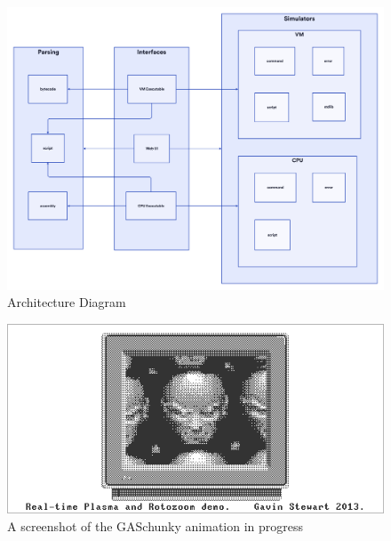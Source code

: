 \begin{center}
  \begin{figure}[h]
    \includegraphics[width=14cm]{fig/architecture.png}
    \caption{Architecture Diagram}%
    \label{fig:arch}
  \end{figure}
\end{center}

\begin{center}
  \begin{figure}[h]
    \includegraphics[width=14cm]{fig/gaschunky.png}
    \caption{A screenshot of the GASchunky animation in progress}%
    \label{fig:gaschunky-screenshot}
  \end{figure}
\end{center}


